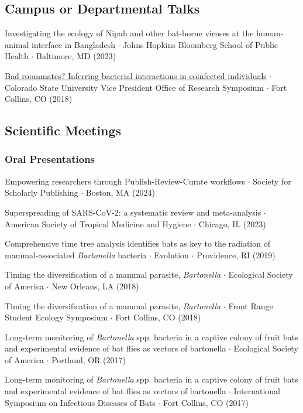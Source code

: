 \documentclass{cv}
\begin{document}
\subsection*{Campus or Departmental Talks}

Investigating the ecology of Nipah and other bat-borne viruses at the human-animal interface in Bangladesh $\cdot$ Johns Hopkins Bloomberg School of Public Health $\cdot$ Baltimore, MD (2023)

\href{https://www.youtube.com/watch?v=lYWR_dZRdjE}{Bad roommates? Inferring bacterial interactions in coinfected individuals} $\cdot$ Colorado State University Vice President Office of Research Symposium $\cdot$ Fort Collins, CO (2018)

\subsection*{Scientific Meetings}

\subsubsection*{Oral Presentations}

Empowering researchers through Publish-Review-Curate workflows $\cdot$ Society for Scholarly Publishing $\cdot$ Boston, MA (2024)

Superspreading of SARS-CoV-2: a systematic review and meta-analysis $\cdot$ American Society of Tropical Medicine and Hygiene $\cdot$ Chicago, IL (2023)

Comprehensive time tree analysis identifies bats as key to the radiation of mammal-associated \textit{Bartonella} bacteria $\cdot$ Evolution $\cdot$ Providence, RI (2019)

Timing the diversification of a mammal parasite, \textit{Bartonella} $\cdot$ Ecological Society of America $\cdot$ New Orleans, LA (2018)

Timing the diversification of a mammal parasite, \textit{Bartonella} $\cdot$ Front Range Student Ecology Symposium $\cdot$ Fort Collins, CO (2018)

Long-term monitoring of \textit{Bartonella} spp. bacteria in a captive colony of fruit bats and experimental evidence of bat flies as vectors of bartonella $\cdot$ Ecological Society of America $\cdot$ Portland, OR (2017)

Long-term monitoring of \textit{Bartonella} spp. bacteria in a captive colony of fruit bats and experimental evidence of bat flies as vectors of bartonella $\cdot$ International Symposium on Infectious Diseases of Bats $\cdot$ Fort Collins, CO (2017)
\end{document}
